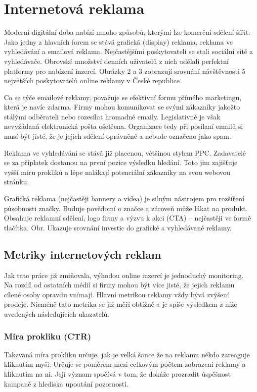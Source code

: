 \section{Internetová reklama}\label{sec:online-ad}
Moderní digitální doba nabízí mnoho způsobů, kterými lze komerční sdělení šířit. Jako jedny z hlavních forem se stává grafická (display) reklama,
reklama ve vyhledávání a emailová reklama. Nejčastějšími poskytovateli se stali sociální sítě a vyhledávače.
Obrovské množství denních uživatelů z nich udělali perfektní platformy pro nabízení inzercí.
Obrázky 2 a 3 zobrazují srovnání návštěvnosti 5 největších poskytovatelů online reklamy v České republice.

Co se týče emailové reklamy, považuje se efektivní formu přímého marketingu, která je navíc zdarma.
Firmy mohou komunikovat se svými zákazníky jakožto stálými odběrateli nebo rozesílat hromadné emaily. Legislativně je však nevyžádaná elektronická pošta ošetřena.
Organizace tedy při posílaní emailů si musí být jisté, že je jejich sdělení oprávněné a nebude označeno jako spam.

Reklama ve vyhledávání se stává již placenou, většinou stylem PPC. Zadavatelé se za příplatek dostanou na první pozice výsledku hledání.
Toto jim zajišťuje vyšší míru prokliků a lépe nalákají potenciální zákazníky na svou webovou stránku. 

Grafická reklama (nejčastěji bannery a videa) je silným nástrojem pro rozšíření působnosti značky. Buduje povědomí o značce a
zároveň může lákat na produkt. Obsahuje reklamní sdělení, logo firmy a výzvu k akci (CTA) -- nejčastěji ve formě tlačítka.
Obr. Ukazuje srovnání investic do grafické a vyhledávané reklamy.

    \subsection{Metriky internetových reklam}\label{ssec:online-ad-metrics}
    Jak tato práce již zmiňovala, výhodou online inzercí je jednoduchý monitoring. Na rozdíl od ostatních médií si firmy mohou být více jisté,
    že jejich reklamu cílené osoby opravdu vnímají. Hlavní metrikou reklamy vždy bývá zvýšení prodeje.
    Nicméně tato metrika se již měří obtížně a je spíše výsledkem z níže uvedených následujících ukazatelů.

        \subsubsection{Míra prokliku (CTR)}
        Takzvaná míra prokliku určuje, jak je velká šance že na reklamu někdo zareaguje kliknutím myši. Určuje se poměrem mezi celkovým počtem zobrazení reklamy a
        kliknutím na ni. Její význam spočívá v tom, že dokáže prozradit úspěšnost kampaně z hlediska upoutání pozornosti.

